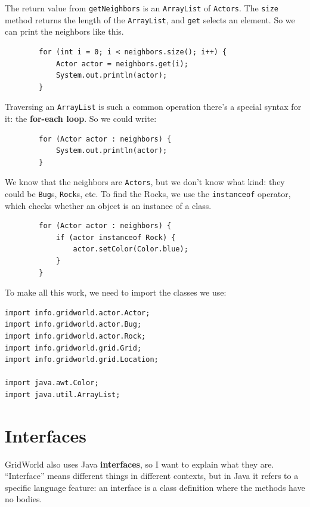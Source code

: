 \documentclass[12pt]{book}
\theoremstyle{exercise}
\begin{document}
The return value from {\tt getNeighbors} is an {\tt ArrayList}
of {\tt Actors}.  The {\tt size} method returns the length of
the {\tt ArrayList}, and {\tt get} selects an element.  So
we can print the neighbors like this.

\begin{lstlisting}
        for (int i = 0; i < neighbors.size(); i++) {
            Actor actor = neighbors.get(i);
            System.out.println(actor);
        }
\end{lstlisting}

Traversing an {\tt ArrayList} is such a common operation there's a
special syntax for it: the {\bf for-each loop}.  So we could write:

\begin{lstlisting}
        for (Actor actor : neighbors) {
            System.out.println(actor);
        }
\end{lstlisting}

We know that the neighbors are {\tt Actors}, but we don't know
what kind: they could be {\tt Bug}s, {\tt Rock}s, etc.
To find the Rocks, we use the {\tt instanceof} operator, which
checks whether an object is an instance of a class.

\begin{lstlisting}
        for (Actor actor : neighbors) {
            if (actor instanceof Rock) {
                actor.setColor(Color.blue);
            }
        }
\end{lstlisting}

To make all this work, we need to import the classes we use:

\begin{lstlisting}
import info.gridworld.actor.Actor;
import info.gridworld.actor.Bug;
import info.gridworld.actor.Rock;
import info.gridworld.grid.Grid;
import info.gridworld.grid.Location;

import java.awt.Color;
import java.util.ArrayList;
\end{lstlisting}


\section{Interfaces}

GridWorld also uses Java {\bf interfaces}, so I want to explain what
they are.  ``Interface'' means different things in different contexts,
but in Java it refers to a specific language feature:
an interface is a class definition where the methods have no bodies.
\end{document}
